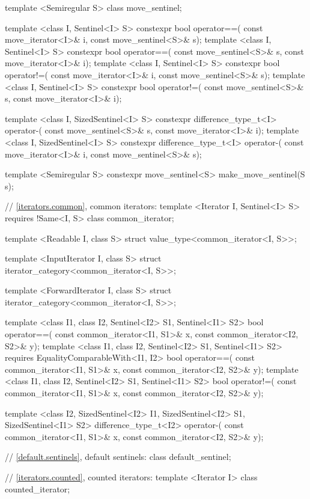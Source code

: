 \begin{codeblock}
{{{{  template <Semiregular S> class move_sentinel;

  template <class I, Sentinel<I> S>
    constexpr bool operator==(
      const move_iterator<I>& i, const move_sentinel<S>& s);
  template <class I, Sentinel<I> S>
    constexpr bool operator==(
      const move_sentinel<S>& s, const move_iterator<I>& i);
  template <class I, Sentinel<I> S>
    constexpr bool operator!=(
      const move_iterator<I>& i, const move_sentinel<S>& s);
  template <class I, Sentinel<I> S>
    constexpr bool operator!=(
      const move_sentinel<S>& s, const move_iterator<I>& i);

  template <class I, SizedSentinel<I> S>
    constexpr difference_type_t<I> operator-(
      const move_sentinel<S>& s, const move_iterator<I>& i);
  template <class I, SizedSentinel<I> S>
    constexpr difference_type_t<I> operator-(
      const move_iterator<I>& i, const move_sentinel<S>& s);

  template <Semiregular S>
    constexpr move_sentinel<S> make_move_sentinel(S s);

  // \ref{iterators.common}, common iterators:
  template <Iterator I, Sentinel<I> S>
    requires !Same<I, S>
  class common_iterator;

  template <Readable I, class S>
  struct value_type<common_iterator<I, S>>;

  template <InputIterator I, class S>
  struct iterator_category<common_iterator<I, S>>;

  template <ForwardIterator I, class S>
  struct iterator_category<common_iterator<I, S>>;

  template <class I1, class I2, Sentinel<I2> S1, Sentinel<I1> S2>
  bool operator==(
    const common_iterator<I1, S1>& x, const common_iterator<I2, S2>& y);
  template <class I1, class I2, Sentinel<I2> S1, Sentinel<I1> S2>
    requires EqualityComparableWith<I1, I2>
  bool operator==(
    const common_iterator<I1, S1>& x, const common_iterator<I2, S2>& y);
  template <class I1, class I2, Sentinel<I2> S1, Sentinel<I1> S2>
  bool operator!=(
    const common_iterator<I1, S1>& x, const common_iterator<I2, S2>& y);

  template <class I2, SizedSentinel<I2> I1, SizedSentinel<I2> S1, SizedSentinel<I1> S2>
  difference_type_t<I2> operator-(
    const common_iterator<I1, S1>& x, const common_iterator<I2, S2>& y);

  // \ref{default.sentinels}, default sentinels:
  class default_sentinel;

  // \ref{iterators.counted}, counted iterators:
  template <Iterator I> class counted_iterator;

}}}}
\end{codeblock}
